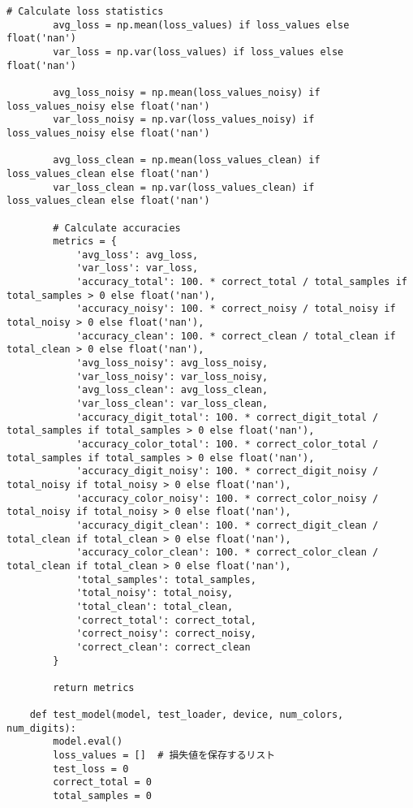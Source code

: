 \begin{lstlisting}[style=pythonstyle, caption={Program Example}]
        # Calculate loss statistics
        avg_loss = np.mean(loss_values) if loss_values else float('nan')
        var_loss = np.var(loss_values) if loss_values else float('nan')
    
        avg_loss_noisy = np.mean(loss_values_noisy) if loss_values_noisy else float('nan')
        var_loss_noisy = np.var(loss_values_noisy) if loss_values_noisy else float('nan')
    
        avg_loss_clean = np.mean(loss_values_clean) if loss_values_clean else float('nan')
        var_loss_clean = np.var(loss_values_clean) if loss_values_clean else float('nan')
    
        # Calculate accuracies
        metrics = {
            'avg_loss': avg_loss,
            'var_loss': var_loss,
            'accuracy_total': 100. * correct_total / total_samples if total_samples > 0 else float('nan'),
            'accuracy_noisy': 100. * correct_noisy / total_noisy if total_noisy > 0 else float('nan'),
            'accuracy_clean': 100. * correct_clean / total_clean if total_clean > 0 else float('nan'),
            'avg_loss_noisy': avg_loss_noisy,
            'var_loss_noisy': var_loss_noisy,
            'avg_loss_clean': avg_loss_clean,
            'var_loss_clean': var_loss_clean,
            'accuracy_digit_total': 100. * correct_digit_total / total_samples if total_samples > 0 else float('nan'),
            'accuracy_color_total': 100. * correct_color_total / total_samples if total_samples > 0 else float('nan'),
            'accuracy_digit_noisy': 100. * correct_digit_noisy / total_noisy if total_noisy > 0 else float('nan'),
            'accuracy_color_noisy': 100. * correct_color_noisy / total_noisy if total_noisy > 0 else float('nan'),
            'accuracy_digit_clean': 100. * correct_digit_clean / total_clean if total_clean > 0 else float('nan'),
            'accuracy_color_clean': 100. * correct_color_clean / total_clean if total_clean > 0 else float('nan'),
            'total_samples': total_samples,
            'total_noisy': total_noisy,
            'total_clean': total_clean,
            'correct_total': correct_total,
            'correct_noisy': correct_noisy,
            'correct_clean': correct_clean
        }
    
        return metrics
    
    def test_model(model, test_loader, device, num_colors, num_digits):
        model.eval()
        loss_values = []  # 損失値を保存するリスト
        test_loss = 0
        correct_total = 0
        total_samples = 0
    

\end{lstlisting}
